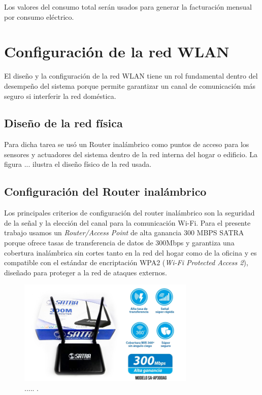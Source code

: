 \begin{enumerate}
Los valores del consumo total serán usados para generar la facturación mensual por consumo eléctrico. 


\end{enumerate}


\section{Configuración de la red WLAN}

El diseño y la configuración de la red WLAN tiene un rol fundamental dentro del desempeño del sistema porque permite garantizar un canal de comunicación más seguro si interferir la red doméstica.

\subsection{Diseño de la red física}

Para dicha tarea se usó un Router inalámbrico como puntos de acceso para los sensores y actuadores del sistema dentro de la red interna del hogar o edificio. La figura ... ilustra el diseño físico de la red usada.


\subsection{Configuración del Router inalámbrico}
Los principales criterios de configuración del router inalámbrico son la seguridad de la señal y la elección del canal para la comunicación Wi-Fi. Para el presente trabajo usamos un \emph{Router/Access Point} de alta ganancia 300 MBPS SATRA porque ofrece tasas de transferencia de datos de 300Mbps y garantiza una cobertura inalámbrica sin cortes tanto en la red del hogar como de la oficina y es compatible con el estándar de encriptación WPA2 (\emph{Wi-Fi Protected Access 2}), diseñado para proteger a la red de ataques externos. 

\begin{figure}[htpb]
\centering 
\includegraphics[width=0.75\textwidth]{./Figures/router.jpg}
\caption{..... .}
\label{fig:router}
\end{figure}

